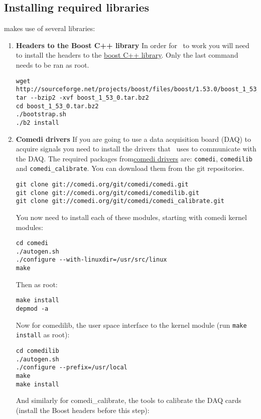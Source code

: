 \subsection{Installing required libraries} 
\label{install:required}
\textbf{\progname} makes use of several libraries:
\begin{enumerate}
	\label{install:boost}
	\item \textbf{Headers to the Boost C++ library}
	In order for \progname\ to work you will need to install the headers to the \href{http://www.boost.org}{boost C++ library}. Only the last command needs to be ran as root.
\begin{lstlisting}
wget http://sourceforge.net/projects/boost/files/boost/1.53.0/boost_1_53_0.tar.bz2
tar --bzip2 -xvf boost_1_53_0.tar.bz2
cd boost_1_53_0.tar.bz2
./bootstrap.sh
./b2 install
\end{lstlisting}

	\item \textbf{Comedi drivers}
If you are going to use a data acquisition board (DAQ) to acquire signals you need to install the drivers that \progname\ uses to communicate with the DAQ. The required packages from\href{http://www.comedi.org}{comedi drivers} are: \texttt{comedi}, \texttt{comedilib} and \texttt{comedi\_calibrate}. You can download them from the git repositories.
\begin{lstlisting}
git clone git://comedi.org/git/comedi/comedi.git
git clone git://comedi.org/git/comedi/comedilib.git
git clone git://comedi.org/git/comedi/comedi_calibrate.git
\end{lstlisting}
You now need to install each of these modules, starting with comedi kernel modules:

\begin{lstlisting}
cd comedi
./autogen.sh
./configure --with-linuxdir=/usr/src/linux
make
\end{lstlisting}
Then as root:

\begin{lstlisting}
make install
depmod -a
\end{lstlisting}
Now for comedilib, the user space interface to the kernel module (run \texttt{make install} as root):

\begin{lstlisting}
cd comedilib
./autogen.sh
./configure --prefix=/usr/local
make
make install
\end{lstlisting}
And similarly for comedi\_calibrate, the tools to calibrate the DAQ cards (install the Boost headers before this step):


\end{enumerate}
